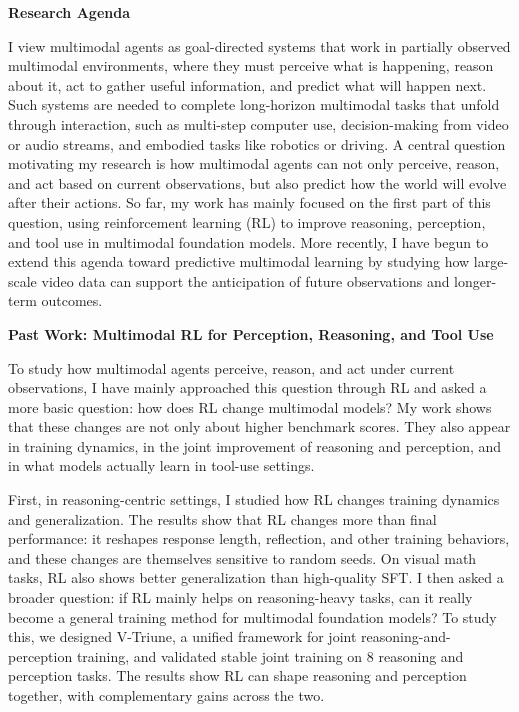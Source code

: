 \documentclass[10pt,letterpaper]{article}
\newcommand{\statementsection}[1]{%
  \vspace{0.15em}%
  {\normalsize\bfseries #1\par}%
  \vspace{0.15em}%
}
\begin{document}

\normalsize

\statementsection{Research Agenda}

I view multimodal agents as goal-directed systems that work in partially observed multimodal environments, where they must perceive what is happening, reason about it, act to gather useful information, and predict what will happen next. Such systems are needed to complete long-horizon multimodal tasks that unfold through interaction, such as multi-step computer use, decision-making from video or audio streams, and embodied tasks like robotics or driving.
%
A central question motivating my research is how multimodal agents can not only perceive, reason, and act based on current observations, but also predict how the world will evolve after their actions. So far, my work has mainly focused on the first part of this question, using reinforcement learning (RL) to improve reasoning, perception, and tool use in multimodal foundation models. More recently, I have begun to extend this agenda toward predictive multimodal learning by studying how large-scale video data can support the anticipation of future observations and longer-term outcomes.

\statementsection{Past Work: Multimodal RL for Perception, Reasoning, and Tool Use}

To study how multimodal agents perceive, reason, and act under current observations, I have mainly approached this question through RL and asked a more basic question: how does RL change multimodal models? My work shows that these changes are not only about higher benchmark scores. They also appear in training dynamics, in the joint improvement of reasoning and perception, and in what models actually learn in tool-use settings.

First, in reasoning-centric settings, I studied how RL changes training dynamics and generalization. The results show that RL changes more than final performance: it reshapes response length, reflection, and other training behaviors, and these changes are themselves sensitive to random seeds. On visual math tasks, RL also shows better generalization than high-quality SFT. I then asked a broader question: if RL mainly helps on reasoning-heavy tasks, can it really become a general training method for multimodal foundation models? To study this, we designed V-Triune, a unified framework for joint reasoning-and-perception training, and validated stable joint training on 8 reasoning and perception tasks. The results show RL can shape reasoning and perception together, with complementary gains across the two.
\end{document}
